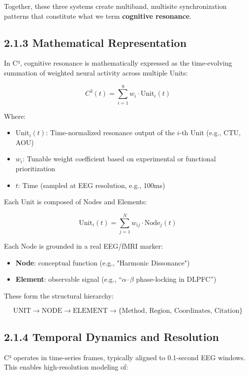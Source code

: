 \documentclass[10pt]{article}
\begin{document}
Together, these three systems create multiband, multisite synchronization patterns that constitute what we term \textbf{cognitive resonance}.

\subsection*{2.1.3 Mathematical Representation}

In C³, cognitive resonance is mathematically expressed as the time-evolving summation of weighted neural activity across multiple Units:

\[
C^3(t) = \sum_{i=1}^{9} w_i \cdot \text{Unit}_i(t)
\]

Where:

\begin{itemize}
    \item $\text{Unit}_i(t)$: Time-normalized resonance output of the $i$-th Unit (e.g., CTU, AOU)
    \item $w_i$: Tunable weight coefficient based on experimental or functional prioritization
    \item $t$: Time (sampled at EEG resolution, e.g., 100ms)
\end{itemize}

Each Unit is composed of Nodes and Elements:

\[
\text{Unit}_i(t) = \sum_{j=1}^{N} w_{ij} \cdot \text{Node}_j(t)
\]

Each Node is grounded in a real EEG/fMRI marker:

\begin{itemize}
    \item \textbf{Node}: conceptual function (e.g., "Harmonic Dissonance")
    \item \textbf{Element}: observable signal (e.g., “$\alpha$–$\beta$ phase-locking in DLPFC”)
\end{itemize}

These form the structural hierarchy:

\[
\text{UNIT} \rightarrow \text{NODE} \rightarrow \text{ELEMENT} \rightarrow \{\text{Method, Region, Coordinates, Citation}\}
\]

\subsection*{2.1.4 Temporal Dynamics and Resolution}

C³ operates in time-series frames, typically aligned to 0.1-second EEG windows. This enables high-resolution modeling of:
\end{document}
